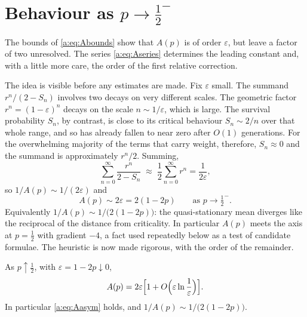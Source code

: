 \section{Behaviour as \texorpdfstring{$p\to\tfrac12^-$}{p to 1/2}}
\label{a:sec:asymptotic}

The bounds of \cref{a:eq:Abounds} show that $A(p)$ is of order $\varepsilon$, but
leave a factor of two unresolved. The series \cref{a:eq:Aseries} determines the
leading constant and, with a little more care, the order of the first relative
correction.

The idea is visible before any estimates are made. Fix $\varepsilon$ small. The
summand $r^n/(2-S_n)$ involves two decays on very different scales. The geometric
factor $r^n = (1-\varepsilon)^n$ decays on the scale $n\sim1/\varepsilon$, which
is large. The survival probability $S_n$, by contrast, is close to its critical
behaviour $S_n\sim2/n$ over that whole range, and so has already fallen to near
zero after $O(1)$ generations. For the overwhelming majority of the terms that
carry weight, therefore, $S_n\approx0$ and the summand is approximately $r^n/2$.
Summing,
\begin{equation*}
\sum_{n=0}^{\infty}\frac{r^n}{2-S_n}
\;\approx\;
\frac12\sum_{n=0}^{\infty}r^n = \frac{1}{2\varepsilon},
\end{equation*}
so $1/A(p)\sim1/(2\varepsilon)$ and
\begin{equation}
\label{a:eq:Aasym}
\boxed{\;A(p)\sim2\varepsilon = 2(1-2p)\qquad\text{as }p\to\tfrac12^-.\;}
\end{equation}
Equivalently $1/A(p)\sim1/\bigl(2(1-2p)\bigr)$: the quasi-stationary mean diverges
like the reciprocal of the distance from criticality. In particular $A(p)$ meets
the axis at $p=\tfrac12$ with gradient $-4$, a fact used repeatedly below as a
test of candidate formulae. The heuristic is now made rigorous, with the order of
the remainder.

\begin{theorem}
\label{a:thm:nearcrit}
As $p\uparrow\tfrac12$, with $\varepsilon=1-2p\downarrow0$,
\begin{equation}
\label{a:eq:Anearcrit}
A(p) = 2\varepsilon\Bigl[1+O\Bigl(\varepsilon\ln\frac1\varepsilon\Bigr)\Bigr] .
\end{equation}
In particular \cref{a:eq:Aasym} holds, and
$1/A(p)\sim1/\bigl(2(1-2p)\bigr)$.
\end{theorem}

